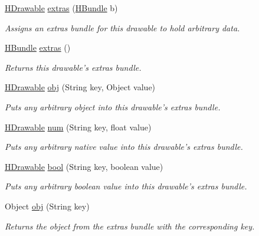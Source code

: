 \begin{DoxyCompactItemize}
\hyperlink{classhype_1_1drawable_1_1_h_drawable}{H\-Drawable} \hyperlink{classhype_1_1drawable_1_1_h_drawable_ad4fa503b7d89fb5d1c75ccde9db95372}{extras} (\hyperlink{classhype_1_1util_1_1_h_bundle}{H\-Bundle} b)
\begin{DoxyCompactList}\small\item\em Assigns an {\itshape extras bundle} for this drawable to hold arbitrary data. \end{DoxyCompactList}\item 
\hyperlink{classhype_1_1util_1_1_h_bundle}{H\-Bundle} \hyperlink{classhype_1_1drawable_1_1_h_drawable_a7505189d57beed823910e448eada428e}{extras} ()
\begin{DoxyCompactList}\small\item\em Returns this drawable's {\itshape extras bundle}. \end{DoxyCompactList}\item 
\hyperlink{classhype_1_1drawable_1_1_h_drawable}{H\-Drawable} \hyperlink{classhype_1_1drawable_1_1_h_drawable_a89ded5375f1c76df4b672196303343fd}{obj} (String key, Object value)
\begin{DoxyCompactList}\small\item\em Puts any arbitrary object into this drawable's {\itshape extras bundle}. \end{DoxyCompactList}\item 
\hyperlink{classhype_1_1drawable_1_1_h_drawable}{H\-Drawable} \hyperlink{classhype_1_1drawable_1_1_h_drawable_a301762c66d0222fa940d766a5fc61d66}{num} (String key, float value)
\begin{DoxyCompactList}\small\item\em Puts any arbitrary native value into this drawable's {\itshape extras bundle}. \end{DoxyCompactList}\item 
\hyperlink{classhype_1_1drawable_1_1_h_drawable}{H\-Drawable} \hyperlink{classhype_1_1drawable_1_1_h_drawable_afd9c440d3b5d30006d2644d1f07dc23e}{bool} (String key, boolean value)
\begin{DoxyCompactList}\small\item\em Puts any arbitrary boolean value into this drawable's {\itshape extras bundle}. \end{DoxyCompactList}\item 
Object \hyperlink{classhype_1_1drawable_1_1_h_drawable_ae9ef9be1550351bb13884016ccc755f1}{obj} (String key)
\begin{DoxyCompactList}\small\item\em Returns the object from the {\itshape extras bundle} with the corresponding key. \end{DoxyCompactList}\item 

\end{DoxyCompactItemize}
